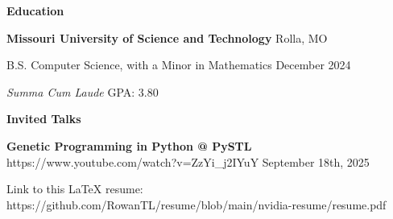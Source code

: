 \documentclass[11pt]{article}
\begin{document}
\begin{center}
    \textbf{Education}
\end{center}
\textbf{Missouri University of Science and Technology} \hfill Rolla, MO

B.S. Computer Science, with a Minor in Mathematics \hfill December 2024

\textit{Summa Cum Laude} \hfill GPA: 3.80

\begin{center}
    \textbf{Invited Talks}
\end{center}

\textbf{Genetic Programming in Python @ PySTL} \tiny{https://www.youtube.com/watch?v=ZzYi\_j2IYuY} \hfill \normalsize{September 18th, 2025}

\begin{center}
    \tiny{Link to this LaTeX resume: https://github.com/RowanTL/resume/blob/main/nvidia-resume/resume.pdf}
\end{center}
\end{document}
